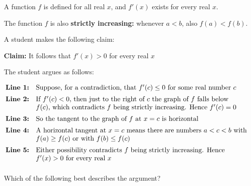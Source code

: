 \documentclass[11pt,a4paper]{article}
\begin{document}
\clearpage
\thispagestyle{djspaper}
\vspace*{8pt}
\begin{enumerate}[label=\textbf{\arabic*.},leftmargin=*,itemsep=0pt,start=15]
A function $f$ is defined for all real $x$, and $f'(x)$ exists for every real $x$.

The function $f$ is also \textbf{strictly increasing:} whenever $a<b$, also $f(a)<f(b)$.

A student makes the following claim:
\begin{center}
\begin{minipage}{0.82\linewidth}
\centering
\textbf{Claim:} It follows that $f'(x)>0$ for every real $x$
\end{minipage}
\end{center}
The student argues as follows:

\[
\begin{array}{@{}rl@{}}
\textbf{Line 1:} & \text{Suppose, for a contradiction, that $f'(c)\le 0$ for some real number $c$} \\[5pt]
\textbf{Line 2:} & \text{If $f'(c)<0$, then just to the right of $c$ the graph of $f$ falls below} \\ 
& \text{$f(c)$, which contradicts $f$ being strictly increasing. Hence $f'(c)=0$} \\[5pt]
\textbf{Line 3:} & \text{So the tangent to the graph of $f$ at $x=c$ is horizontal} \\[5pt]
\textbf{Line 4:} & \text{A horizontal tangent at $x=c$ means there are numbers $a<c<b$ with} \\ 
& \text{$f(a)\ge f(c)$ or with $f(b)\le f(c)$} \\[5pt]
\textbf{Line 5:} & \text{Either possibility contradicts $f$ being strictly increasing. Hence} \\ 
& \text{$f'(x)>0$ for every real $x$} \\[5pt]
\end{array}
\]

Which of the following best describes the argument?


\end{enumerate}
\end{document}
